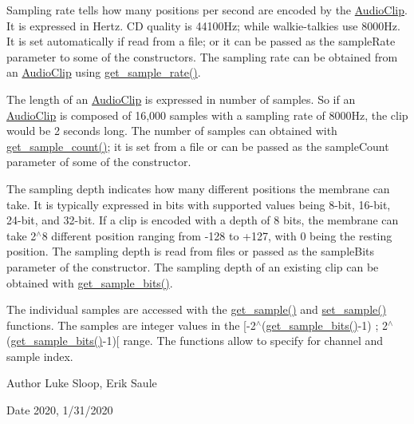 Sampling rate tells how many positions per second are encoded by the \hyperlink{classbridges_1_1audio__clip_1_1_audio_clip}{Audio\+Clip}. It is expressed in Hertz. CD quality is 44100\+Hz; while walkie-\/talkies use 8000\+Hz. It is set automatically if read from a file; or it can be passed as the sample\+Rate parameter to some of the constructors. The sampling rate can be obtained from an \hyperlink{classbridges_1_1audio__clip_1_1_audio_clip}{Audio\+Clip} using \hyperlink{classbridges_1_1audio__clip_1_1_audio_clip_a6e9cad3d81f39b3fe811307f024fa713}{get\+\_\+sample\+\_\+rate()}.

The length of an \hyperlink{classbridges_1_1audio__clip_1_1_audio_clip}{Audio\+Clip} is expressed in number of samples. So if an \hyperlink{classbridges_1_1audio__clip_1_1_audio_clip}{Audio\+Clip} is composed of 16,000 samples with a sampling rate of 8000\+Hz, the clip would be 2 seconds long. The number of samples can obtained with \hyperlink{classbridges_1_1audio__clip_1_1_audio_clip_ace0227160e6743e8fd19c803af81d474}{get\+\_\+sample\+\_\+count()}; it is set from a file or can be passed as the sample\+Count parameter of some of the constructor.

The sampling depth indicates how many different positions the membrane can take. It is typically expressed in bits with supported values being 8-\/bit, 16-\/bit, 24-\/bit, and 32-\/bit. If a clip is encoded with a depth of 8 bits, the membrane can take 2$^\wedge$8 different position ranging from -\/128 to +127, with 0 being the resting position. The sampling depth is read from files or passed as the sample\+Bits parameter of the constructor. The sampling depth of an existing clip can be obtained with \hyperlink{classbridges_1_1audio__clip_1_1_audio_clip_a8dc41d20f5c06e83f7aea326072ef32e}{get\+\_\+sample\+\_\+bits()}.

The individual samples are accessed with the \hyperlink{classbridges_1_1audio__clip_1_1_audio_clip_a6ebead4b2cbd7c5d39c3d67775013ac4}{get\+\_\+sample()} and \hyperlink{classbridges_1_1audio__clip_1_1_audio_clip_af9b9e0b615ada4a6802121f59af3da89}{set\+\_\+sample()} functions. The samples are integer values in the \mbox{[}-\/2$^\wedge$(\hyperlink{classbridges_1_1audio__clip_1_1_audio_clip_a8dc41d20f5c06e83f7aea326072ef32e}{get\+\_\+sample\+\_\+bits()}-\/1) ; 2$^\wedge$(\hyperlink{classbridges_1_1audio__clip_1_1_audio_clip_a8dc41d20f5c06e83f7aea326072ef32e}{get\+\_\+sample\+\_\+bits()}-\/1)\mbox{[} range. The functions allow to specify for channel and sample index.

\begin{DoxyAuthor}{Author}
Luke Sloop, Erik Saule
\end{DoxyAuthor}
\begin{DoxyDate}{Date}
2020, 1/31/2020 
\end{DoxyDate}
